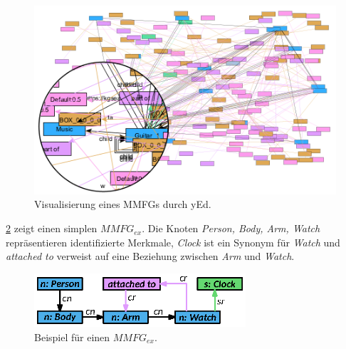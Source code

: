 \begin{figure}[htb]
    \centering
    \includegraphics{resources/images/mmfg-example.png}
    \caption{Visualisierung eines MMFGs durch yEd.}
    \label{sec2:sota:subsec:fz-explainability:fig:mmfg-real-example}
\end{figure}
\cref{sec2:sota:subsec:fz-explainablity:fig:mmfg-example} zeigt einen simplen $MMFG_{ex}$.
Die Knoten \textit{Person, Body, Arm, Watch} repräsentieren identifizierte Merkmale, \textit{Clock} ist ein Synonym für \textit{Watch} und \textit{attached to} verweist auf eine Beziehung zwischen \textit{Arm} und \textit{Watch}.

\begin{figure}
    \centering
    \includegraphics[width=0.7\textwidth]{chapter/chapter_2/mmfg-ex.eps}
    \caption{Beispiel für einen $MMFG_{ex}$.}
    \label{sec2:sota:subsec:fz-explainablity:fig:mmfg-example}
\end{figure}


